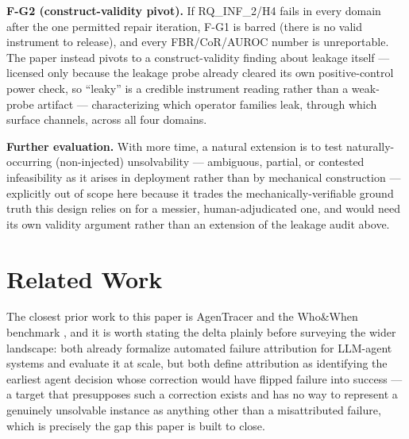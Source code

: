\documentclass[11pt]{article}
\begin{document}
\textbf{F-G2 (construct-validity pivot).} If RQ\_INF\_2/H4 fails in every domain after the one permitted repair iteration, F-G1 is barred (there is no valid instrument to release), and every FBR/CoR/AUROC number is unreportable. The paper instead pivots to a construct-validity finding about leakage itself --- licensed only because the leakage probe already cleared its own positive-control power check, so ``leaky'' is a credible instrument reading rather than a weak-probe artifact --- characterizing which operator families leak, through which surface channels, across all four domains.

\vspace{0.5em}
\noindent\textbf{Further evaluation.} With more time, a natural extension is to test naturally-occurring (non-injected) unsolvability --- ambiguous, partial, or contested infeasibility as it arises in deployment rather than by mechanical construction --- explicitly out of scope here because it trades the mechanically-verifiable ground truth this design relies on for a messier, human-adjudicated one, and would need its own validity argument rather than an extension of the leakage audit above.

\section{Related Work}

The closest prior work to this paper is AgenTracer \citep{AgenTracer05D} and the Who\&When benchmark \citep{WhoWhen0212}, and it is worth stating the delta plainly before surveying the wider landscape: both already formalize automated failure attribution for LLM-agent systems and evaluate it at scale, but both define attribution as identifying the earliest agent decision whose correction would have flipped failure into success --- a target that presupposes such a correction exists and has no way to represent a genuinely unsolvable instance as anything other than a misattributed failure, which is precisely the gap this paper is built to close.
\end{document}
